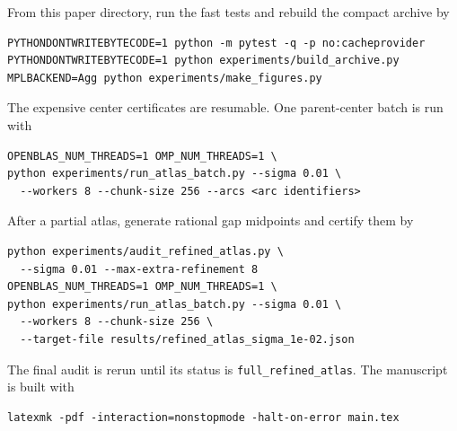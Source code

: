 \documentclass[11pt]{article}
\theoremstyle{definition}
\theoremstyle{remark}
\begin{document}
From this paper directory, run the fast tests and rebuild the compact
archive by
\begin{verbatim}
PYTHONDONTWRITEBYTECODE=1 python -m pytest -q -p no:cacheprovider
PYTHONDONTWRITEBYTECODE=1 python experiments/build_archive.py
MPLBACKEND=Agg python experiments/make_figures.py
\end{verbatim}
The expensive center certificates are resumable.  One parent-center batch
is run with
\begin{verbatim}
OPENBLAS_NUM_THREADS=1 OMP_NUM_THREADS=1 \
python experiments/run_atlas_batch.py --sigma 0.01 \
  --workers 8 --chunk-size 256 --arcs <arc identifiers>
\end{verbatim}
After a partial atlas, generate rational gap midpoints and certify them by
\begin{verbatim}
python experiments/audit_refined_atlas.py \
  --sigma 0.01 --max-extra-refinement 8
OPENBLAS_NUM_THREADS=1 OMP_NUM_THREADS=1 \
python experiments/run_atlas_batch.py --sigma 0.01 \
  --workers 8 --chunk-size 256 \
  --target-file results/refined_atlas_sigma_1e-02.json
\end{verbatim}
The final audit is rerun until its status is
\texttt{full\_refined\_atlas}.  The manuscript is built with
\begin{verbatim}
latexmk -pdf -interaction=nonstopmode -halt-on-error main.tex
\end{verbatim}



\end{document}
